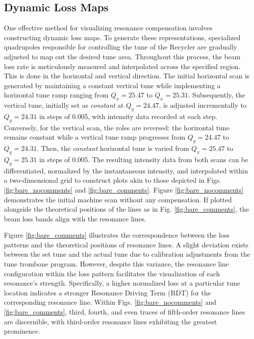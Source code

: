 \subsection{\label{sec:lossmaps}Dynamic Loss Maps}

One effective method for visualizing resonance compensation involves constructing dynamic loss maps. To generate these representations, specialized quadrupoles responsible for controlling the tune of the Recycler are gradually adjusted to map out the desired tune area. Throughout this process, the beam loss rate is meticulously measured and interpolated across the specified region. This is done in the horizontal and vertical direction. The initial horizontal scan is generated by maintaining a constant vertical tune while implementing a horizontal tune ramp ranging from $Q_x=25.47$ to $Q_x=25.31$. Subsequently, the vertical tune, initially set as \textit{constant} at $Q_y=24.47$, is adjusted incrementally to $Q_y=24.31$ in steps of 0.005, with intensity data recorded at each step. Conversely, for the vertical scan, the roles are reversed: the horizontal tune remains constant while a vertical tune ramp progresses from $Q_y=24.47$ to $Q_y=24.31$. Then, the \textit{constant} horizontal tune is varied from $Q_x=25.47$ to $Q_y=25.31$ in steps of 0.005. The resulting intensity data from both scans can be differentiated, normalized by the instantaneous intensity, and interpolated within a two-dimensional grid to construct plots akin to those depicted in Figs. \ref{fig:bare_nocomments} and \ref{fig:bare_comments}. Figure \ref{fig:bare_nocomments} demonstrates the initial machine scan without any compensation. If plotted alongside the theoretical positions of the lines as in Fig. \ref{fig:bare_comments}, the beam loss bands align with the resonance lines. 

Figure \ref{fig:bare_comments} illustrates the correspondence between the loss patterns and the theoretical positions of resonance lines. A slight deviation exists between the set tune and the actual tune due to calibration adjustments from the tune trombone program. However, despite this variance, the resonance line configuration within the loss pattern facilitates the visualization of each resonance's strength. Specifically, a higher normalized loss at a particular tune location indicates a stronger Resonance Driving Term (RDT) for the corresponding resonance line. Within Figs. \ref{fig:bare_nocomments} and \ref{fig:bare_comments}, third, fourth, and even traces of fifth-order resonance lines are discernible, with third-order resonance lines exhibiting the greatest prominence.

